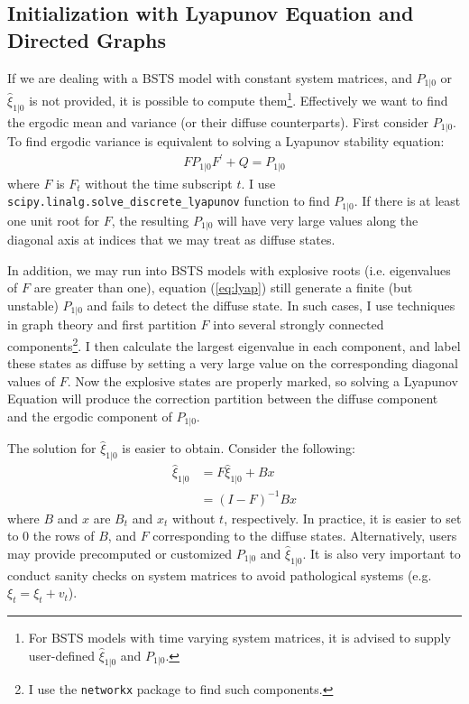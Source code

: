 \documentclass[10pt, titlepage]{article}
\numberwithin{equation}{section}
\begin{document}
\subsection{Initialization with Lyapunov Equation and Directed Graphs} 
If we are dealing with a BSTS model with constant system matrices, and $P_{1|0}$ or $\hat{\xi}_{1|0}$ is not provided, it is possible to compute them\footnote{For BSTS models with time varying system matrices, it is advised to supply user-defined $\hat{\xi}_{1|0}$ and $P_{1|0}$.}. Effectively we want to find the ergodic mean and variance (or their diffuse counterparts). First consider $P_{1|0}$. To find ergodic variance is equivalent to solving a Lyapunov stability equation:
\begin{align}
    FP_{1|0}F^{'} + Q = P_{1|0} \label{eq:lyap}
\end{align}
where $F$ is $F_t$ without the time subscript $t$. I use \texttt{scipy.linalg.solve\_discrete\_lyapunov} function to find $P_{1|0}$. If there is at least one unit root for $F$, the resulting $P_{1|0}$ will have very large values along the diagonal axis at indices that we may treat as diffuse states. 

In addition, we may run into BSTS models with explosive roots (i.e. eigenvalues of $F$ are greater than one), equation (\ref{eq:lyap}) still generate a finite (but unstable) $P_{1|0}$ and fails to detect the diffuse state. In such cases, I use techniques in graph theory and first partition $F$ into several strongly connected components\footnote{I use the \texttt{networkx} package to find such components.}. I then calculate the largest eigenvalue in each component, and label these states as diffuse by setting a very large value on the corresponding diagonal values of $F$. Now the explosive states are properly marked, so solving a Lyapunov Equation will produce the correction partition between the diffuse component and the ergodic component of $P_{1|0}$.

The solution for $\hat{\xi}_{1|0}$ is easier to obtain. Consider the following:
\begin{align*}
    \hat{\xi}_{1|0} &= F\hat{\xi}_{1|0} + Bx \\
    &= (I - F)^{-1}Bx
\end{align*}
where $B$ and $x$ are $B_t$ and $x_t$ without $t$, respectively. In practice, it is easier to set to $0$ the rows of $B$, and $F$ corresponding to the diffuse states. Alternatively, users may provide precomputed or customized $P_{1|0}$ and $\hat{\xi}_{1|0}$. It is also very important to conduct sanity checks on system matrices to avoid pathological systems (e.g. $\xi_{t} = \xi_t + v_t$).
\end{document}
